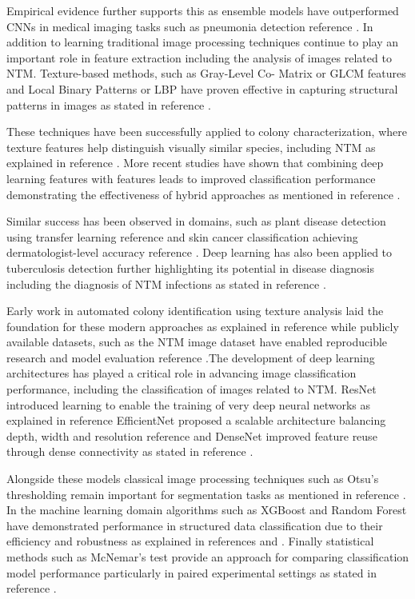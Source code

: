 \documentclass[journal,article,submit,pdftex,moreauthors]{Definitions/mdpi}
\begin{document}
Empirical evidence further supports this as ensemble models have outperformed CNNs in medical imaging tasks such as pneumonia detection reference \cite{kumar2017}. In addition to learning traditional image processing techniques continue to play an important role in feature extraction including the analysis of images related to NTM. Texture-based methods, such as Gray-Level Co- Matrix or GLCM features and Local Binary Patterns or LBP have proven effective in capturing structural patterns in images as stated in reference \cite{haralick1973, ojala2002}.
 
These techniques have been successfully applied to colony characterization, where texture features help distinguish visually similar species, including NTM as explained in reference \cite{johnson2022}. More recent studies have shown that combining deep learning features with features leads to improved classification performance demonstrating the effectiveness of hybrid approaches as mentioned in reference \cite{zhang2024}.
 
Similar success has been observed in domains, such as plant disease detection using transfer learning reference \cite{chen2020} and skin cancer classification achieving dermatologist-level accuracy reference \cite{esteva2017}. Deep learning has also been applied to tuberculosis detection further highlighting its potential in disease diagnosis including the diagnosis of NTM infections as stated in reference \cite{lopez2017}.
 
Early work in automated colony identification using texture analysis laid the foundation for these modern approaches as explained in reference \cite{crowley2008} while publicly available datasets, such as the NTM image dataset have enabled reproducible research and model evaluation reference \cite{mendeley2025}.The development of deep learning architectures has played a critical role in advancing image classification performance, including the classification of images related to NTM. ResNet introduced learning to enable the training of very deep neural networks as explained in reference \cite{he2016} EfficientNet proposed a scalable architecture balancing depth, width and resolution reference \cite{tan2019} and DenseNet improved feature reuse through dense connectivity as stated in reference \cite{huang2017}.
 
 Alongside these models classical image processing techniques such as Otsu's thresholding remain important for segmentation tasks as mentioned in reference \cite{otsu1979}. In the machine learning domain algorithms such as XGBoost and Random Forest have demonstrated performance in structured data classification due to their efficiency and robustness as explained in references \cite{chen2016} and \cite{breiman2001}. Finally statistical methods such as McNemar's test provide an approach for comparing classification model performance particularly in paired experimental settings as stated in reference \cite{mcnemar1947}.
\end{document}
